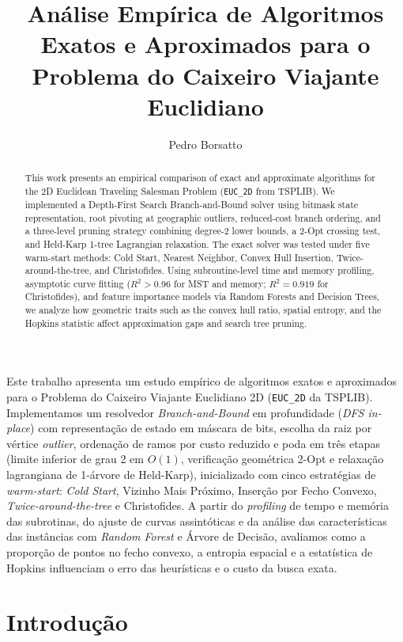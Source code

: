 \documentclass[12pt]{article}
\title{Análise Empírica de Algoritmos Exatos e Aproximados para o Problema do Caixeiro Viajante Euclidiano}
\author{Pedro Borsatto\inst{1}}
\begin{document}
\maketitle

\begin{abstract}
  This work presents an empirical comparison of exact and approximate algorithms for the 2D Euclidean Traveling Salesman Problem (\texttt{EUC\_2D} from TSPLIB). We implemented a Depth-First Search Branch-and-Bound solver using bitmask state representation, root pivoting at geographic outliers, reduced-cost branch ordering, and a three-level pruning strategy combining degree-2 lower bounds, a 2-Opt crossing test, and Held-Karp 1-tree Lagrangian relaxation. The exact solver was tested under five warm-start methods: Cold Start, Nearest Neighbor, Convex Hull Insertion, Twice-around-the-tree, and Christofides. Using subroutine-level time and memory profiling, asymptotic curve fitting ($R^2 > 0.96$ for MST and memory; $R^2 = 0.919$ for Christofides), and feature importance models via Random Forests and Decision Trees, we analyze how geometric traits such as the convex hull ratio, spatial entropy, and the Hopkins statistic affect approximation gaps and search tree pruning.
\end{abstract}

\begin{resumo}
  Este trabalho apresenta um estudo empírico de algoritmos exatos e aproximados para o Problema do Caixeiro Viajante Euclidiano 2D (\texttt{EUC\_2D} da TSPLIB). Implementamos um resolvedor \textit{Branch-and-Bound} em profundidade (\textit{DFS in-place}) com representação de estado em máscara de bits, escolha da raiz por vértice \textit{outlier}, ordenação de ramos por custo reduzido e poda em três etapas (limite inferior de grau 2 em $O(1)$, verificação geométrica 2-Opt e relaxação lagrangiana de 1-árvore de Held-Karp), inicializado com cinco estratégias de \textit{warm-start}: \textit{Cold Start}, Vizinho Mais Próximo, Inserção por Fecho Convexo, \textit{Twice-around-the-tree} e Christofides. A partir do \textit{profiling} de tempo e memória das subrotinas, do ajuste de curvas assintóticas e da análise das características das instâncias com \textit{Random Forest} e Árvore de Decisão, avaliamos como a proporção de pontos no fecho convexo, a entropia espacial e a estatística de Hopkins influenciam o erro das heurísticas e o custo da busca exata.
\end{resumo}

\section{Introdução}
\end{document}
